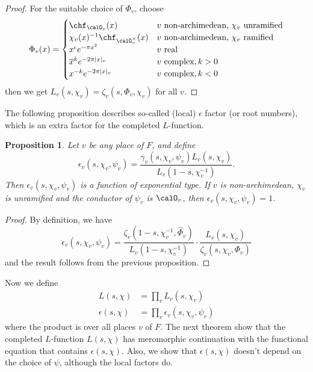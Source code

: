 \documentclass{article}
\newtheorem{proposition}{Proposition}[section]
\begin{document}
\begin{proof}
For the suitable choice of $\Phi_{v}$, choose
\begin{align*}
\Phi_{v}(x) = \begin{cases} \chf_{\calO_{v}}(x) & v\text{ non-archimedean, $\chi_{v}$ unramified} \\
\chi_{v}(x)^{-1} \chf_{\calO_{v}^{\times}}(x) & v\text{ non-archimedean, $\chi_{v}$ ramified} \\
x^{\epsilon}e^{-\pi x^{2}} & v \text{ real} \\
\overline{x}^{k} e^{-2\pi |x|_{v}} & v\text{ complex}, k>0 \\
x^{-k} e^{-2\pi |x|_{v}} & v \text{ complex}, k<0
\end{cases}
\end{align*}
then we get $L_{v}(s, \chi_{v}) = \zeta_{v}(s, \Phi_{v}, \chi_{v})$ for all $v$. 
\end{proof}



The following proposition describes so-called (local) $\epsilon$ factor (or root numbers), which is an extra factor for the completed $L$-function. 
\begin{proposition}
Let $v$ be any place of $F$, and define 
$$
\epsilon_{v}(s, \chi_{v}, \psi_{v}) = \frac{\gamma_{v}(s, \chi_{v}, \psi_{v})L_{v}(s, \chi_{v})}{L_{v}(1-s, \chi_{v}^{-1})}.
$$
Then $\epsilon_{v}(s, \chi_{v}, \psi_{v})$ is a function of exponential type. 
If  $v$ is non-archimedean, $\chi_{v}$ is unramified and the conductor of $\psi_{v}$ is $\calO_{v}$, then $\epsilon_{v}(s, \chi_{v}, \psi_{v}) = 1$. 
\end{proposition}

\begin{proof}
By definition, we have
$$
\epsilon_{v}(s, \chi_{v}, \psi_{v}) = \frac{\zeta_{v}(1-s, \chi_{v}^{-1}, \widehat{\Phi}_{v})}{L_{v}(1-s, \chi_{v}^{-1})} \cdot \frac{L_{v}(s, \chi_{v})}{\zeta_{v}(s, \chi_{v}, \Phi_{v})} 
$$
and the result follows from the previous proposition. 
\end{proof}

Now we define
\begin{align*}
L(s, \chi) &= \prod_{v} L_{v}(s, \chi_{v}) \\
\epsilon(s, \chi) &= \prod_{v} \epsilon_{v}(s, \chi_{v}, \psi_{v})
\end{align*}
where the product is over all places $v$ of $F$. 
The next theorem show that the completed $L$-function $L(s, \chi)$ has meromorphic continuation with the functional equation that contains $\epsilon(s, \chi)$. Also, we show that $\epsilon(s, \chi)$ doesn't depend on the choice of $\psi$, although the local factors do. 
\end{document}
